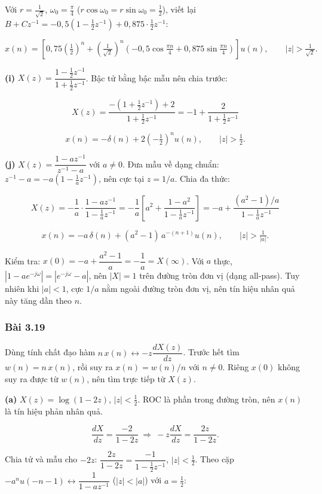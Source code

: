 \documentclass[12pt,a4paper]{article}
\begin{document}
Với \(r=\tfrac{1}{\sqrt2}\), \(\omega_0=\tfrac{\pi}{4}\)
(\(r\cos\omega_0=r\sin\omega_0=\tfrac12\)), viết lại
\(B+Cz^{-1}=-0{,}5\left(1-\tfrac12z^{-1}\right)+0{,}875\cdot\tfrac12z^{-1}\):

\[x(n)=\left[0{,}75\left(\tfrac12\right)^n+\left(\tfrac{1}{\sqrt2}\right)^n\left(-0{,}5\cos\tfrac{\pi n}{4}+0{,}875\sin\tfrac{\pi n}{4}\right)\right]u(n),\qquad |z|>\tfrac{1}{\sqrt2}.\]

\textbf{(i)} \(X(z)=\dfrac{1-\frac12z^{-1}}{1+\frac12z^{-1}}\). Bậc tử
bằng bậc mẫu nên chia trước:

\[X(z)=\frac{-\left(1+\frac12z^{-1}\right)+2}{1+\frac12z^{-1}}=-1+\frac{2}{1+\frac12z^{-1}}\]

\[x(n)=-\delta(n)+2\left(-\tfrac12\right)^nu(n),\qquad |z|>\tfrac12.\]

\textbf{(j)} \(X(z)=\dfrac{1-az^{-1}}{z^{-1}-a}\) với \(a\ne0\). Đưa mẫu
về dạng chuẩn: \(z^{-1}-a=-a\left(1-\tfrac1az^{-1}\right)\), nên cực tại
\(z=1/a\). Chia đa thức:

\[X(z)=-\frac1a\cdot\frac{1-az^{-1}}{1-\frac1az^{-1}}=-\frac1a\left[a^2+\frac{1-a^2}{1-\frac1az^{-1}}\right]=-a+\frac{(a^2-1)/a}{1-\frac1az^{-1}}\]

\[x(n)=-a\,\delta(n)+(a^2-1)\,a^{-(n+1)}u(n),\qquad |z|>\tfrac{1}{|a|}.\]

Kiểm tra: \(x(0)=-a+\dfrac{a^2-1}{a}=-\dfrac1a=X(\infty)\). Với \(a\)
thực, \(|1-ae^{-j\omega}|=|e^{-j\omega}-a|\), nên \(|X|=1\) trên đường
tròn đơn vị (dạng all-pass). Tuy nhiên khi \(|a|<1\), cực \(1/a\) nằm
ngoài đường tròn đơn vị, nên tín hiệu nhân quả này tăng dần theo \(n\).

\subsubsection*{Bài 3.19}
Dùng tính chất đạo hàm \(n\,x(n)\leftrightarrow -z\dfrac{dX(z)}{dz}\).
Trước hết tìm \(w(n)=n\,x(n)\), rồi suy ra \(x(n)=w(n)/n\) với
\(n\neq0\). Riêng \(x(0)\) không suy ra được từ \(w(n)\), nên tìm trực
tiếp từ \(X(z)\).

\textbf{(a)} \(X(z)=\log(1-2z)\), \(|z|<\tfrac12\). ROC là phần trong
đường tròn, nên \(x(n)\) là tín hiệu phản nhân quả.

\[\frac{dX}{dz}=\frac{-2}{1-2z}\ \Rightarrow\ -z\frac{dX}{dz}=\frac{2z}{1-2z}.\]

Chia tử và mẫu cho \(-2z\):
\(\dfrac{2z}{1-2z}=\dfrac{-1}{1-\frac12z^{-1}}\), \(|z|<\tfrac12\). Theo
cặp \(-a^nu(-n-1)\leftrightarrow\dfrac{1}{1-az^{-1}}\) (\(|z|<|a|\)) với
\(a=\tfrac12\):
\end{document}
